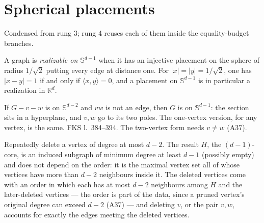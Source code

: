 \section{Spherical placements}

Condensed from rung 3; rung 4 reuses each of them inside the equality-budget branches.

\begin{definition}
  \label{lem:sphere-orth}
  \leanok
  A graph is \emph{realizable on $\mathbb{S}^{d-1}$} when it has an injective placement on
  the sphere of radius $1/\sqrt 2$ putting every edge at distance one. For
  $\lvert x\rvert = \lvert y\rvert = 1/\sqrt 2$, one has $\lvert x - y\rvert = 1$ if and
  only if $\langle x, y\rangle = 0$, and a placement on $\mathbb{S}^{d-1}$ is in particular
  a realization in $\mathbb{R}^d$.
\end{definition}

\begin{lemma}[Poles]
  \label{lem:poles}
  \leanok
  If $G - v - w$ is on $\mathbb{S}^{d-2}$ and $vw$ is not an edge, then $G$ is on
  $\mathbb{S}^{d-1}$: the section sits in a hyperplane, and $v, w$ go to its two poles. The
  one-vertex version, for any vertex, is the same. FKS l.~384--394. The two-vertex form
  needs $v \ne w$ (A37).
\end{lemma}

\begin{lemma}
  \label{lem:core}
  \leanok
  Repeatedly delete a vertex of degree at most $d - 2$. The result $H$, the $(d-1)$-core, is
  an induced subgraph of minimum degree at least $d - 1$ (possibly empty) and does not depend
  on the order: it is the maximal vertex set all of whose vertices have more than $d - 2$
  neighbours inside it. The deleted vertices come with an order in which each has at most
  $d - 2$ neighbours among $H$ and the later-deleted vertices --- the order is part of the
  data, since a pruned vertex's original degree can exceed $d - 2$ (A37) --- and deleting
  $v$, or the pair $v, w$, accounts for exactly the edges meeting the deleted vertices.
\end{lemma}

